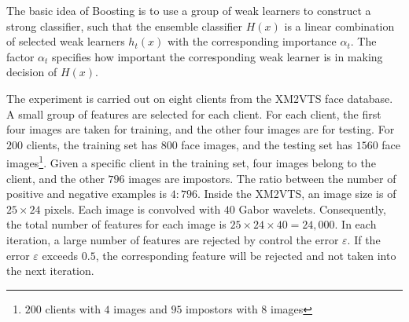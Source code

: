 \documentclass[a4paper,10pt]{article}
\begin{document}
The basic idea of Boosting is to use a group of weak learners to construct a strong classifier, such that the ensemble classifier $H(x)$ is a linear combination of selected weak learners $h_t(x)$ with the corresponding importance $\alpha_t$. The factor $\alpha_t$ specifies how important the corresponding weak learner is in making decision of $H(x)$.

The experiment is carried out on eight clients from the \mbox{XM2VTS} face database. A small group of features are selected for each client. For each client, the first four images are taken for training, and the other four images are for testing. For $200$ clients, the training set has $800$ face images, and the testing set has $1560$ face images\footnote{$200$ clients with $4$ images and $95$ impostors with $8$ images}. Given a specific client in the training set, four images belong to the client, and the other $796$ images are impostors. The ratio between the number of positive and negative examples is $4:796$. Inside the \mbox{XM2VTS}, an image size is of $25\times24$ pixels. Each image is convolved with $40$ Gabor wavelets. Consequently, the total number of features for each image is $25\times24\times40=24,000$.  In each iteration, a large number of features are rejected by control the error $\varepsilon$. If the error $\varepsilon$ exceeds $0.5$, the corresponding feature will be rejected and not taken into the next iteration.
\end{document}
